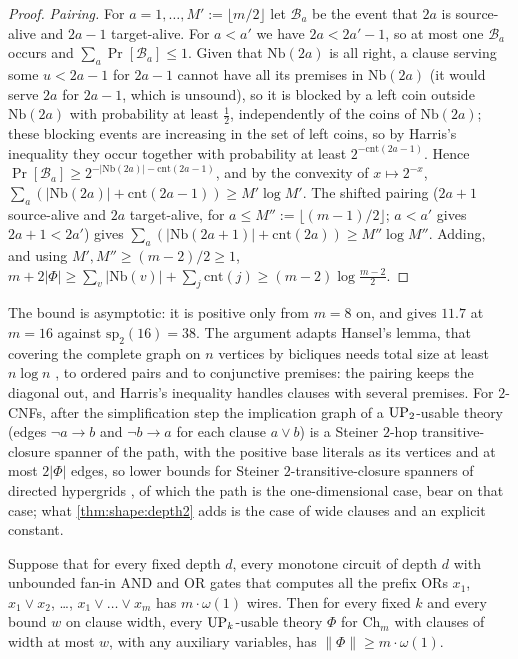 \begin{proof}
\emph{Pairing.} For $a=1,\dots,M':=\lfloor m/2\rfloor$ let $\mathcal B_a$ be the event that $2a$ is source-alive and $2a-1$ target-alive. For $a<a'$ we have $2a<2a'-1$, so at most one $\mathcal B_a$ occurs and $\sum_a\Pr[\mathcal B_a]\le1$. Given that $\mathrm{Nb}(2a)$ is all right, a clause serving some $u<2a-1$ for $2a-1$ cannot have all its premises in $\mathrm{Nb}(2a)$ (it would serve $2a$ for $2a-1$, which is unsound), so it is blocked by a left coin outside $\mathrm{Nb}(2a)$ with probability at least $\frac12$, independently of the coins of $\mathrm{Nb}(2a)$; these blocking events are increasing in the set of left coins, so by Harris's inequality they occur together with probability at least $2^{-\mathrm{cnt}(2a-1)}$. Hence $\Pr[\mathcal B_a]\ge2^{-\lvert\mathrm{Nb}(2a)\rvert-\mathrm{cnt}(2a-1)}$, and by the convexity of $x\mapsto2^{-x}$, $\sum_a(\lvert\mathrm{Nb}(2a)\rvert+\mathrm{cnt}(2a-1))\ge M'\log M'$. The shifted pairing ($2a+1$ source-alive and $2a$ target-alive, for $a\le M'':=\lfloor(m-1)/2\rfloor$; $a<a'$ gives $2a+1<2a'$) gives $\sum_a(\lvert\mathrm{Nb}(2a+1)\rvert+\mathrm{cnt}(2a))\ge M''\log M''$. Adding, and using $M',M''\ge(m-2)/2\ge1$, $m+2\lvert\Phi\rvert\ge\sum_v\lvert\mathrm{Nb}(v)\rvert+\sum_j\mathrm{cnt}(j)\ge(m-2)\log\frac{m-2}2$.
\end{proof}

The bound is asymptotic: it is positive only from $m=8$ on, and gives $11.7$ at $m=16$ against $\mathrm{sp}_2(16)=38$. The argument adapts Hansel's lemma, that covering the complete graph on $n$ vertices by bicliques needs total size at least $n\log n$ \citep{hansel1964nombre,katona1967problem}, to ordered pairs and to conjunctive premises: the pairing keeps the diagonal out, and Harris's inequality handles clauses with several premises. For $2$-CNFs, after the simplification step the implication graph of a $\mathrm{UP}_2$-usable theory (edges $\neg a\to b$ and $\neg b\to a$ for each clause $a\vee b$) is a Steiner $2$-hop transitive-closure spanner of the path, with the positive base literals as its vertices and at most $2\lvert\Phi\rvert$ edges, so lower bounds for Steiner $2$-transitive-closure spanners of directed hypergrids \citep{berman2014steiner}, of which the path is the one-dimensional case, bear on that case; what \cref{thm:shape:depth2} adds is the case of wide clauses and an explicit constant.

\begin{proposition}\label{prop:shape:fixeddepth}
Suppose that for every fixed depth $d$, every monotone circuit of depth $d$ with unbounded fan-in AND and OR gates that computes all the prefix ORs $x_1$, $x_1\vee x_2$, \dots, $x_1\vee\dots\vee x_m$ has $m\cdot\omega(1)$ wires. Then for every fixed $k$ and every bound $w$ on clause width, every $\mathrm{UP}_k$-usable theory $\Phi$ for $\mathrm{Ch}_m$ with clauses of width at most $w$, with any auxiliary variables, has $\lVert\Phi\rVert\ge m\cdot\omega(1)$.
\end{proposition}

